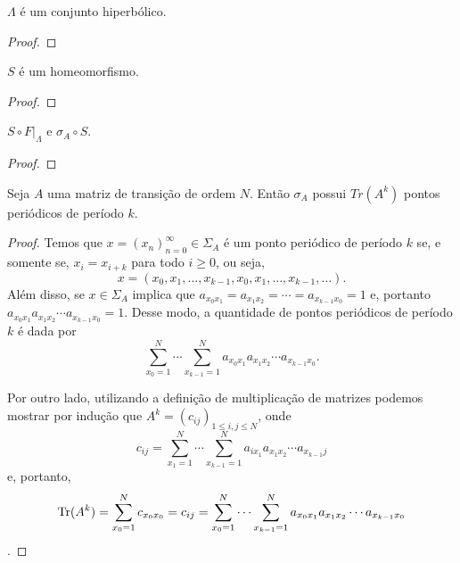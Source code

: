 \begin{lemma}
$\Lambda$ é um conjunto hiperbólico.
\end{lemma}


\begin{proof}

\end{proof}


\begin{lemma}
$S$ é um homeomorfismo.
\end{lemma}


\begin{proof}

\end{proof}


\begin{theorem}
$S \circ F|_\Lambda$ e $\sigma_A \circ S$.
\end{theorem}


\begin{proof}

\end{proof}


\begin{proposition}
Seja $A$ uma matriz de transição de ordem $N$. Então $\sigma_A$ possui $Tr(A^k)$ pontos periódicos de período $k$.
\end{proposition}


\begin{proof}
Temos que $x = (x_n)_{n=0}^\infty \in \Sigma_A$ é um ponto periódico de período $k$ se, e somente se, $x_i = x_{i+k}$ para todo $i \geq 0$, ou seja,
$$x = (x_0, x_1, \dots, x_{k-1}, x_0, x_1, \dots, x_{k-1}, \dots).$$
Além disso, se $x \in \Sigma_A$ implica que $a_{x_0 x_1} = a_{x_1 x_2} = \cdots = a_{x_{k-1} x_0} = 1$ e, portanto  $a_{x_0 x_1} a_{x_1 x_2}  \cdots a_{x_{k-1} x_0} = 1$. Desse modo, a quantidade de pontos periódicos de período $k$ é dada por
$$\sum_{x_0 = 1}^N \cdots \sum_{x_{k-1}=1}^N a_{x_0 x_1} a_{x_1 x_2}  \cdots a_{x_{k-1} x_0}.$$

Por outro lado, utilizando a definição de multiplicação de matrizes podemos mostrar por indução que $A^k = (c_{ij})_{1 \leq i, j \leq N}$, onde
$$c_{ij} = \sum_{x_1 = 1}^N \cdots \sum_{x_{k-1}=1}^N a_{i x_1} a_{x_1 x_2}  \cdots a_{x_{k-1}j}$$
e, portanto,
$$\operatorname{Tr}(A^k) = \sum_{x_0 = 1}^N c_{x_0 x_0} = c_{ij} = \sum_{x_0 = 1}^N \cdots \sum_{x_{k-1}=1}^N a_{x_0 x_1} a_{x_1 x_2}  \cdots a_{x_{k-1} x_0}$$.
\end{proof}











